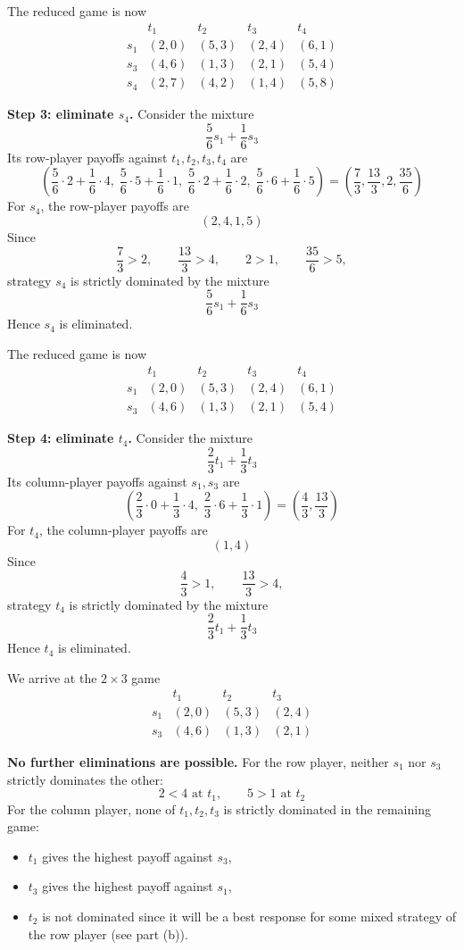 The reduced game is now
\[
\begin{array}{c|cccc}
 & t_1 & t_2 & t_3 & t_4\\
\hline
s_1 & (2,0) & (5,3) & (2,4) & (6,1)\\
s_3 & (4,6) & (1,3) & (2,1) & (5,4)\\
s_4 & (2,7) & (4,2) & (1,4) & (5,8)
\end{array}
\]

\textbf{Step 3: eliminate \(s_4\).}
Consider the mixture
\[
\frac56 s_1+\frac16 s_3
\]
Its row-player payoffs against \(t_1,t_2,t_3,t_4\) are
\[
\left(\frac56\cdot 2+\frac16\cdot 4,\;
\frac56\cdot 5+\frac16\cdot 1,\;
\frac56\cdot 2+\frac16\cdot 2,\;
\frac56\cdot 6+\frac16\cdot 5\right)
=
\left(\frac73,\frac{13}{3},2,\frac{35}{6}\right)
\]
For \(s_4\), the row-player payoffs are
\[
(2,4,1,5)
\]
Since
\[
\frac73>2,\qquad \frac{13}{3}>4,\qquad 2>1,\qquad \frac{35}{6}>5,
\]
strategy \(s_4\) is strictly dominated by the mixture
\[
\frac56 s_1+\frac16 s_3
\]
Hence \(s_4\) is eliminated.

The reduced game is now
\[
\begin{array}{c|cccc}
 & t_1 & t_2 & t_3 & t_4\\
\hline
s_1 & (2,0) & (5,3) & (2,4) & (6,1)\\
s_3 & (4,6) & (1,3) & (2,1) & (5,4)
\end{array}
\]

\textbf{Step 4: eliminate \(t_4\).}
Consider the mixture
\[
\frac23 t_1+\frac13 t_3
\]
Its column-player payoffs against \(s_1,s_3\) are
\[
\left(\frac23\cdot 0+\frac13\cdot 4,\;
\frac23\cdot 6+\frac13\cdot 1\right)
=
\left(\frac43,\frac{13}{3}\right)
\]
For \(t_4\), the column-player payoffs are
\[
(1,4)
\]
Since
\[
\frac43>1,\qquad \frac{13}{3}>4,
\]
strategy \(t_4\) is strictly dominated by the mixture
\[
\frac23 t_1+\frac13 t_3
\]
Hence \(t_4\) is eliminated.

We arrive at the \(2\times 3\) game
\[
\boxed{
\begin{array}{c|ccc}
 & t_1 & t_2 & t_3\\
\hline
s_1 & (2,0) & (5,3) & (2,4)\\
s_3 & (4,6) & (1,3) & (2,1)
\end{array}}
\]

\textbf{No further eliminations are possible.}
For the row player, neither \(s_1\) nor \(s_3\) strictly dominates the other:
\[
2<4 \text{ at } t_1,\qquad 5>1 \text{ at } t_2
\]
For the column player, none of \(t_1,t_2,t_3\) is strictly dominated in the remaining game:
\begin{itemize}
\item \(t_1\) gives the highest payoff against \(s_3\),
\item \(t_3\) gives the highest payoff against \(s_1\),
\item \(t_2\) is not dominated since it will be a best response for some mixed strategy of the row player (see part (b)).
\end{itemize}

